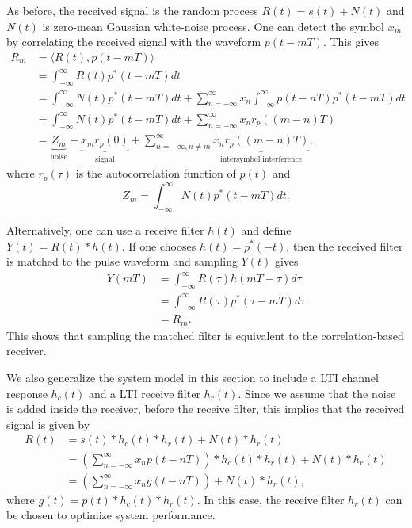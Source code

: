 As before, the received signal is the random process $R(t) = s(t) + N(t)$ and $N(t)$ is zero-mean Gaussian white-noise process.
One can detect the symbol $x_m$  by correlating the received signal with the waveform $p(t-mT)$.
This gives
\begin{align*}
R_m &= \langle R(t), p (t-mT) \rangle \\
&= \int_{-\infty}^{\infty} R(t) p^* (t-mT) dt \\
&=  \int_{-\infty}^{\infty} N(t) p^* (t-mT) dt +
\sum_{n = -\infty}^{\infty} x_n \int_{-\infty}^{\infty} p(t-nT) p^* (t-mT) dt \\
&=  \int_{-\infty}^{\infty} N(t) p^* (t-mT) dt +
\sum_{n = -\infty}^{\infty} x_n r_p \left( (m-n) T \right) \\
&=  \underbrace{Z_m}_{\mathrm{noise}} + \underbrace{x_m r_p (0)}_{\mathrm{signal}} + \sum_{n = -\infty, n\neq m}^{\infty} \underbrace{x_n r_p \left( (m-n) T \right)}_{\mathrm{intersymbol\;interference}},
\end{align*}
where $r_p (\tau)$ is the autocorrelation function of $p(t)$ and
\[ Z_m =  \int_{-\infty}^{\infty} N(t) p^* (t-mT) dt. \]

Alternatively, one can use a receive filter $h(t)$ and define $Y(t) = R(t) * h(t)$.
If one chooses $h(t) = p^* (-t)$, then the received filter is matched to the pulse waveform and sampling $Y(t)$ gives
\begin{align*}
Y(mT)
&= \int_{-\infty}^{\infty} R(\tau) h(mT-\tau) d \tau \\
&= \int_{-\infty}^{\infty} R(\tau) p^* (\tau - mT) d \tau \\
&= R_m .
\end{align*}
This shows that sampling the matched filter is equivalent to the correlation-based receiver.


\iffalse
We also generalize the system model in this section to include a LTI channel response $h_c (t)$ and a LTI receive filter $h_r (t)$.
Since we assume that the noise is added inside the receiver, before the receive filter, this implies that the received signal is given by
\begin{align*}
R(t)
&= s(t) * h_c (t) * h_r (t) + N(t) * h_r(t) \\
&= \left( \sum_{n = -\infty}^{\infty} x_n p (t - nT) \right) * h_c (t) * h_r (t) + N(t) * h_r(t) \\
&= \left( \sum_{n = -\infty}^{\infty} x_n g(t - nT) \right) + N(t) * h_r(t),
\end{align*}
where $g(t) = p (t) * h_c (t) * h_r (t)$.
In this case, the receive filter $h_r (t)$ can be chosen to optimize system performance.

